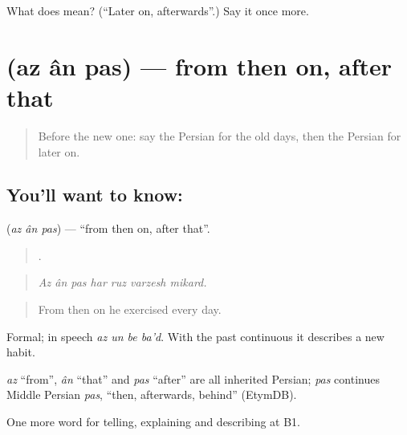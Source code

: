 \begin{tcolorbox}[breakable,colback=teal!4,colframe=teal!35!black,title={Before you move on}]
What does  mean? (\textquotedblleft{}Later on, afterwards\textquotedblright{}.) Say it once more.
\end{tcolorbox}
\section[\texorpdfstring{\fa{از} \fa{آن} \fa{پس} (az ân pas)}{از آن پس (az ân pas)}]{   (az ân pas) — from then on, after that}

\label{lesson:FA-C304-az-an-pas}



\begin{quote}
Before the new one: say the Persian for the old days, then the Persian for later on.
\end{quote}

\subsection*{You'll want to know:   }
\textbf{  } (\emph{az ân pas}) — \textquotedblleft{}from then on, after that\textquotedblright{}.

\begin{quote}
      .
\end{quote}

\begin{quote}
\emph{Az ân pas har ruz varzesh mikard.}
\end{quote}

\begin{quote}
From then on he exercised every day.
\end{quote}

Formal; in speech \emph{az un be ba'd}. With the past continuous it describes a new habit.

\begin{cousinweb}
\emph{az} \textquotedblleft{}from\textquotedblright{}, \emph{ân} \textquotedblleft{}that\textquotedblright{} and \emph{pas} \textquotedblleft{}after\textquotedblright{} are all inherited Persian; \emph{pas} continues Middle Persian \emph{pas}, \textquotedblleft{}then, afterwards, behind\textquotedblright{} (EtymDB).
\end{cousinweb}

\begin{grammarlens}[title={What you've built}]
One more word for telling, explaining and describing at B1.
\end{grammarlens}

